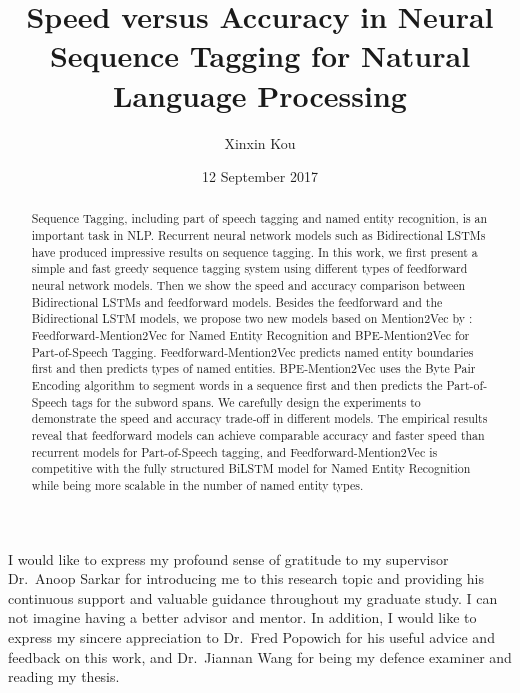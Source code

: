 \documentclass{sfuthesis}
\title{Speed versus Accuracy in Neural Sequence Tagging for Natural Language Processing}
\author{Xinxin Kou}
\date{12 September 2017}
\newcommand{\ma}{Feedforward-Mention2Vec}
\newcommand{\mb}{BPE-Mention2Vec}
\begin{document}
\frontmatter
\maketitle{}

\begin{abstract}
Sequence Tagging, including part of speech tagging and named entity recognition, is an important task in NLP. Recurrent neural network models such as Bidirectional LSTMs have produced impressive results on sequence tagging. In this work, we first present a simple and fast greedy sequence tagging system using different types of feedforward neural network models. Then we show the speed and accuracy comparison between Bidirectional LSTMs and feedforward models. Besides the feedforward and the Bidirectional LSTM models, we propose two new models based on Mention2Vec by \cite{stratos2016mention2vec}: \ma{} for Named Entity Recognition and \mb{} for Part-of-Speech Tagging. \ma{} predicts named entity boundaries first and then predicts types of named entities. \mb{} uses the Byte Pair Encoding algorithm to segment words in a sequence first and then predicts the Part-of-Speech tags for the subword spans. We carefully design the experiments to demonstrate the speed and accuracy trade-off in different models. The empirical results reveal that feedforward models can achieve comparable accuracy and faster speed than recurrent models for Part-of-Speech tagging, and \ma{} is competitive with the fully structured BiLSTM model for Named Entity Recognition while being more scalable in the number of named entity types.

\end{abstract}


\begin{acknowledgements} %

I would like to express my profound sense of gratitude to my supervisor Dr.\ Anoop Sarkar for introducing me to this research
topic and providing his continuous support and valuable guidance throughout my graduate study. I can not imagine having a better advisor and mentor. In addition, I would like to express my sincere appreciation to Dr.\ Fred Popowich for his useful advice and feedback on this work, and Dr.\ Jiannan Wang for being my defence examiner and reading my thesis.




\end{acknowledgements}

\tableofcontents\clearpage
{}\listoftables\clearpage
{}\listoffigures
\end{document}
